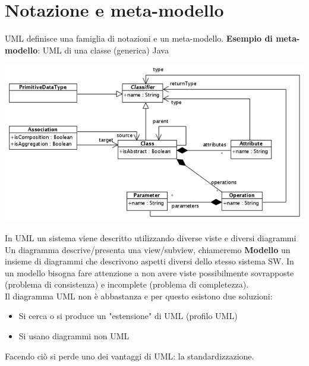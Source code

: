 \documentclass[12pt, a4paper]{report}
\begin{document}
\section{Notazione e meta-modello}
UML definisce una famiglia di notazioni e un meta-modello.
\textbf{Esempio di meta-modello}: UML di una classe (generica) Java
\begin{center}
    \includegraphics[width=.8\textwidth]{Immagini/UMLmetamodello.png}
\end{center}
In UML un sistema viene descritto utilizzando diverse viste e diversi diagrammi
Un diagramma descrive/presenta una view/subview, chiameremo \textbf{Modello} un insieme di diagrammi che descrivono aspetti diversi dello stesso sistema SW. In un modello bisogna fare attenzione a non avere viste possibilmente sovrapposte (problema di consistenza) e incomplete (problema di completezza).\\
Il diagramma UML non è abbastanza e per questo esistono due soluzioni:
\begin{itemize}
    \item Si cerca o si produce un "estensione" di UML (profilo UML)
    \item Si usano diagrammi non UML
\end{itemize}
Facendo ciò si perde uno dei  vantaggi di UML: la standardizzazione.
\end{document}
